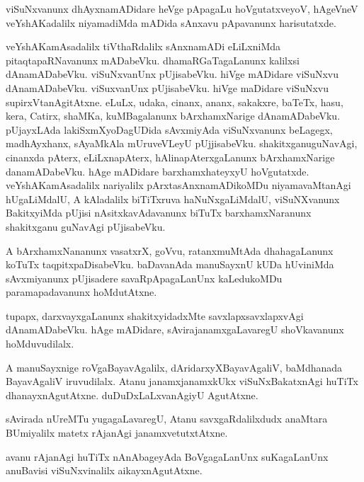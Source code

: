 \documentclass{article}
\begin{document}
\begin{mn}%
viSuNxvanunx dhAyxnamADidare heVge pApagaLu hoVgutatxveyoV, hAgeVneV veYshAKadalilx 
niyamadiMda mADida sAnxavu pApavanunx harisutatxde.
\end{mn}

\begin{mn}%
veYshAKamAsadalilx tiVthaRdalilx sAnxnamADi eLiLxniMda pitaqtapaRNavanunx mADabeVku. 
dhamaRGaTagaLanunx kalilxsi dAnamADabeVku. viSuNxvanUnx pUjisabeVku. hiVge mADidare
viSuNxvu dAnamADabeVku. viSuxvanUnx pUjisabeVku. hiVge maDidare viSuNxvu 
supirxVtanAgitAtxne. eLuLx, udaka, cinanx, ananx, sakakxre, baTeTx, hasu, kera, Catirx, 
shaMKa, kuMBagalanunx bArxhamxNarige dAnamADabeVku. pUjayxLAda lakiSxmXyoDagUDida 
sAvxmiyAda viSuNxvanunx beLagegx, madhAyxhanx, sAyaMkAla mUruveVLeyU pUjjisabeVku. 
shakitxganuguNavAgi, cinanxda pAterx, eLiLxnapAterx, hAlinapAterxgaLanunx bArxhamxNarige 
danamADabeVku. hAge mADidare barxhamxhateyxyU hoVgutatxde. veYshAKamAsadalilx nariyalilx 
pArxtasAnxnamADikoMDu niyamavaMtanAgi hUgaLiMdalU, A kAladalilx biTiTxruva 
haNuNxgaLiMdalU, viSuNXvanunx BakitxyiMda pUjisi nAsitxkavAdavanunx biTuTx 
barxhamxNaranunx shakitxganu guNavAgi pUjisabeVku.
\end{mn}

\begin{mn}%
A bArxhamxNananunx vasatxrX, goVvu, ratanxmuMtAda dhahagaLanunx koTuTx taqpitxpaDisabeVku. 
baDavanAda manuSayxnU kUDa hUviniMda sAvxmiyanunx pUjisadere savaRpApagaLanUnx 
kaLedukoMDu paramapadavanunx hoMdutAtxne.
\end{mn}

\begin{mn}%
tupapx, darxvayxgaLanunx shakitxyidadxMte savxlapxsavxlapxvAgi dAnamADabeVku. hAge 
mADidare, sAvirajanamxgaLavaregU shoVkavanunx hoMduvudilalx.
\end{mn}

\begin{mn}%
A manuSayxnige roVgaBayavAgalilx, dAridarxyXBayavAgaliV, baMdhanada BayavAgaliV 
iruvudilalx. Atanu janamxjanamxkUkx viSuNxBakatxnAgi huTiTx dhanayxnAgutAtxne. 
duDuDxLaLxvanAgiyU AgutAtxne.
\end{mn}

\begin{mn}%
sAvirada nUreMTu yugagaLavaregU, Atanu savxgaRdalilxdudx anaMtara BUmiyalilx matetx 
rAjanAgi janamxvetutxtAtxne.
\end{mn}

\begin{mn}%
avanu rAjanAgi huTiTx nAnAbageyAda BoVgagaLanUnx suKagaLanUnx anuBavisi viSuNxvinalilx 
aikayxnAgutAtxne.
\end{mn}
\end{document}
